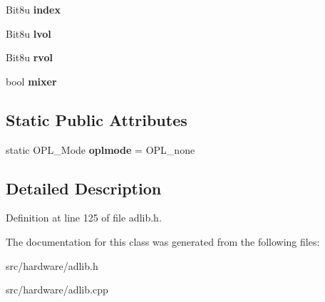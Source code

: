 \begin{DoxyCompactItemize}
\item 
\hypertarget{classAdlib_1_1Module_a3cf5b48a356e922f13ff3fff91867cc5}{Bit8u {\bfseries index}}\label{classAdlib_1_1Module_a3cf5b48a356e922f13ff3fff91867cc5}

\item 
\hypertarget{classAdlib_1_1Module_ac5f795bd406e34f70cd30986e173aa58}{Bit8u {\bfseries lvol}}\label{classAdlib_1_1Module_ac5f795bd406e34f70cd30986e173aa58}

\item 
\hypertarget{classAdlib_1_1Module_ab69d004a0e0df215c99cd9aae6b25448}{Bit8u {\bfseries rvol}}\label{classAdlib_1_1Module_ab69d004a0e0df215c99cd9aae6b25448}

\item 
\hypertarget{classAdlib_1_1Module_ad6fb6e1c8fc28811c3848c754ec5d250}{bool {\bfseries mixer}}\label{classAdlib_1_1Module_ad6fb6e1c8fc28811c3848c754ec5d250}

\end{DoxyCompactItemize}
\subsection*{Static Public Attributes}
\begin{DoxyCompactItemize}
\item 
\hypertarget{classAdlib_1_1Module_a4b15a75a7fed20aa923ee1ad44a0e6c2}{static O\-P\-L\-\_\-\-Mode {\bfseries oplmode} = O\-P\-L\-\_\-none}\label{classAdlib_1_1Module_a4b15a75a7fed20aa923ee1ad44a0e6c2}

\end{DoxyCompactItemize}


\subsection{Detailed Description}


Definition at line 125 of file adlib.\-h.



The documentation for this class was generated from the following files\-:\begin{DoxyCompactItemize}
\item 
src/hardware/adlib.\-h\item 
src/hardware/adlib.\-cpp\end{DoxyCompactItemize}
